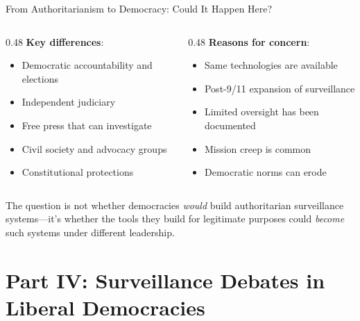 ﻿\documentclass[aspectratio=169,11pt]{beamer}
\begin{document}
\begin{frame}{From Authoritarianism to Democracy: Could It Happen Here?}
\begin{columns}[T]
\begin{column}{0.48\textwidth}
\textbf{Key differences}:
\begin{itemize}
    \item Democratic accountability and elections
    \item Independent judiciary
    \item Free press that can investigate
    \item Civil society and advocacy groups
    \item Constitutional protections
\end{itemize}
\end{column}
\begin{column}{0.48\textwidth}
\textbf{Reasons for concern}:
\begin{itemize}
    \item Same technologies are available
    \item Post-9/11 expansion of surveillance
    \item Limited oversight has been documented
    \item Mission creep is common
    \item Democratic norms can erode
\end{itemize}
\end{column}
\end{columns}

\vspace{0.3em}
\begin{quotebox}
\small
The question is not whether democracies \emph{would} build authoritarian surveillance systems---it's whether the tools they build for legitimate purposes could \emph{become} such systems under different leadership.
\end{quotebox}
\end{frame}

\section{Part IV: Surveillance Debates in Liberal Democracies}
\end{document}
